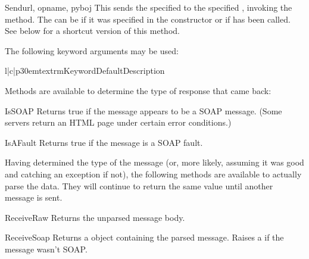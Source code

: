 \begin{methoddesc}{Send}{url, opname, pyboj}
This sends the specified  to the specified , invoking
the  method.
The  can be  if it was specified in the 
constructor or if  has been called.
See below for a shortcut version of this method.

The following keyword arguments may be used:

\begin{tableiii}{l|c|p{30em}}{textrm}{Keyword}{Default}{Description}
\end{tableiii}

\end{methoddesc}

Methods are available to determine the type of response that came back:

\begin{methoddesc}{IsSOAP}{}
Returns true if the message appears to be a SOAP message.
(Some servers return an HTML page under certain error conditions.)
\end{methoddesc}

\begin{methoddesc}{IsAFault}{}
Returns true if the message is a SOAP fault.
\end{methoddesc}

Having determined the type of the message (or, more likely, assuming
it was good and catching an exception if not), the following methods
are available to actually parse the data.
They will continue to return the same value until
another message is sent.

\begin{methoddesc}{ReceiveRaw}{}
Returns the unparsed message body.
\end{methoddesc}

\begin{methoddesc}{ReceiveSoap}{}
Returns a  object containing the parsed message.
Raises a  if the message wasn't SOAP.
\end{methoddesc}

